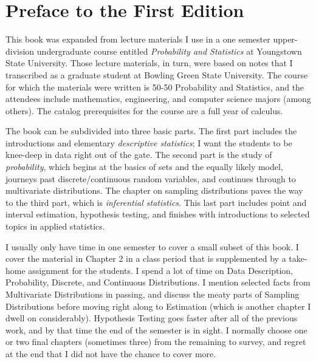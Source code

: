 %
%


\cleardoublepage
{}
{}

\chapter*{Preface to the First Edition}

This book was expanded from lecture materials I use in a one semester upper-division undergraduate course entitled \emph{Probability and Statistics} at Youngstown State University. Those lecture materials, in turn, were based on notes that I transcribed as a graduate student at Bowling Green State University. The course for which the materials were written is 50-50 Probability and Statistics, and the attendees include mathematics, engineering, and computer science majors (among others). The catalog prerequisites for the course are a full year of calculus.

The book can be subdivided into three basic parts. The first part includes the introductions and elementary \emph{descriptive statistics}; I want the students to be knee-deep in data right out of the gate. The second part is the study of \emph{probability}, which begins at the basics of sets and the equally likely model, journeys past discrete/continuous  random variables, and continues through to multivariate distributions. The chapter on sampling distributions paves the way to the third part, which is \emph{inferential statistics}. This last part includes point and interval estimation, hypothesis testing, and finishes with introductions to selected topics in applied statistics.

I usually only have time in one semester to cover a small subset of this book. I cover the material in Chapter 2 in a class period that is supplemented by a take-home assignment for the students. I spend a lot of time on Data Description, Probability, Discrete, and Continuous Distributions. I mention selected facts from Multivariate Distributions in passing, and discuss the meaty parts of Sampling Distributions before moving right along to Estimation (which is another chapter I dwell on considerably). Hypothesis Testing goes faster after all of the previous work, and by that time the end of the semester is in sight. I normally choose one or two final chapters (sometimes three) from the remaining to survey, and regret at the end that I did not have the chance to cover more.

